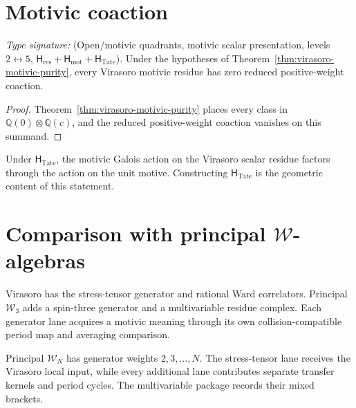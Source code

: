 \section{Motivic coaction}
\label{sec:vmp-no-mzv}

\begin{corollary}
\ClaimStatusConditional
\label{cor:virasoro-no-mzv-contribution}
\emph{Type signature:}
\textup{(Open/motivic quadrants, motivic scalar presentation,
levels \(2\leftrightarrow5\),
\(\mathsf H_{\mathrm{res}}+\mathsf H_{\mathrm{mot}}
+\mathsf H_{\mathrm{Tate}}\)).}
Under the hypotheses of
Theorem~\ref{thm:virasoro-motivic-purity}, every Virasoro motivic
residue has zero reduced positive-weight coaction.
\end{corollary}

\begin{proof}
Theorem~\ref{thm:virasoro-motivic-purity} places every class in
\(\mathbb Q(0)\otimes\mathbb Q(c)\), and the reduced
positive-weight coaction vanishes on this summand.
\end{proof}

\begin{remark}
\label{rem:vmp-grt-action-trivial-on-vir}
Under \(\mathsf H_{\mathrm{Tate}}\), the motivic Galois action on the
Virasoro scalar residue factors through the action on the unit
motive.  Constructing \(\mathsf H_{\mathrm{Tate}}\) is the geometric
content of this statement.
\end{remark}

\section{Comparison with principal \texorpdfstring{$\mathcal W$}{W}-algebras}
\label{sec:vmp-w-algebra-comparison}

\begin{remark}
\label{rem:vir-vs-w3-contrast}
Virasoro has the stress-tensor generator and rational Ward
correlators.  Principal \(\mathcal W_3\) adds a spin-three generator
and a multivariable residue complex.  Each generator lane acquires a
motivic meaning through its own collision-compatible period map and
averaging comparison.
\end{remark}

\begin{remark}
\label{rem:vmp-wn-propagation-bound}
Principal \(\mathcal W_N\) has generator weights
\(2,3,\ldots,N\).  The stress-tensor lane receives the Virasoro local
input, while every additional lane contributes separate transfer
kernels and period cycles.  The multivariable package records their
mixed brackets.
\end{remark}


